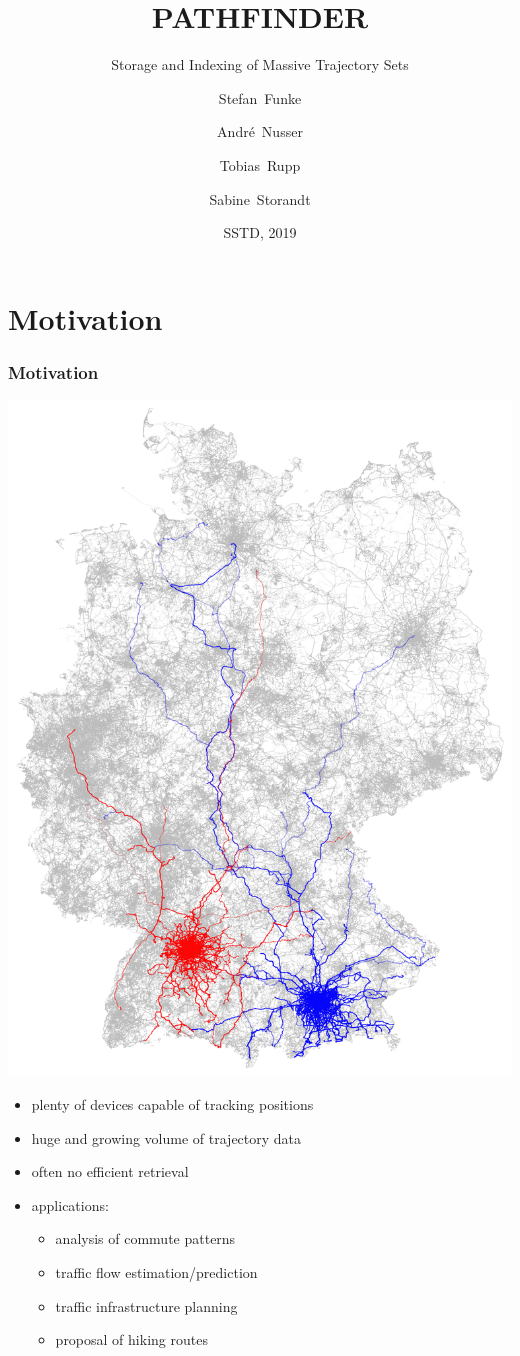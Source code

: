 \documentclass[10pt, t,
aspectratio=1610,%
usenames,
dvipsnames,
]{beamer}
\title[Pathfinder] %
{PATHFINDER}
\subtitle{Storage and Indexing of Massive Trajectory Sets}
\author[Funke, Nusser, Rupp, Storandt] %
{Stefan~Funke\inst{1} \and Andr\'{e}~Nusser\inst{2} \and Tobias~Rupp\inst{3} \and Sabine~Storandt\inst{4}}
\institute[Universities] %
{
	\inst{1}%
	University of Stuttgart
	\and
	\inst{2}%
	Max Planck Institute for Informatics
	\and
	\inst{3}%
	University of Stuttgart
	\and
	\inst{4}%
	University of Konstanz
}
\date[SSTD 2019] %
{SSTD, 2019}
\begin{document}
\frame{\titlepage}

\section{Motivation}
\begin{frame}
	\frametitle{Motivation}
	\begin{minipage}[t]{0.45\textwidth}
		\vspace{0pt}
		\includegraphics[height=0.9\textheight]{images/trajectories.png}
	\end{minipage}
	\hfill
	\begin{minipage}[t]{0.45\textwidth}
		\vspace{0pt}
		\begin{itemize}
			\item<1->plenty of devices capable of tracking positions
			\item<2-> huge and growing volume of trajectory data
			\item<3-> often no efficient retrieval
			\item<4-> applications:
			      \begin{itemize}
				      \item<5-> analysis of commute patterns
				      \item<6-> traffic flow estimation/prediction
				      \item<7-> traffic infrastructure planning
				      \item<8-> proposal of hiking routes
			      \end{itemize}


\end{itemize}
\end{minipage}
\end{frame}
\end{document}
